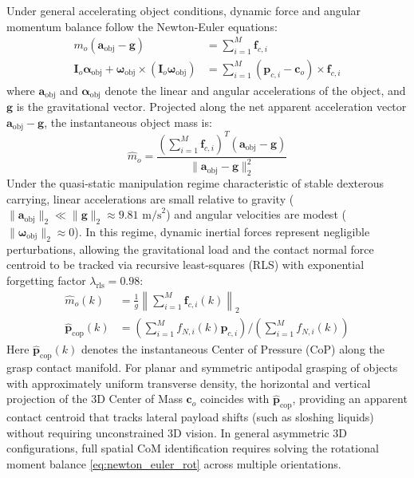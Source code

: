 Under general accelerating object conditions, dynamic force and angular momentum balance follow the Newton-Euler equations:
\begin{align}
    m_o (\mathbf{a}_{\text{obj}} - \mathbf{g}) &= \sum_{i=1}^M \mathbf{f}_{c, i} \label{eq:newton_euler_trans} \\
    \mathbf{I}_o \boldsymbol{\alpha}_{\text{obj}} + \boldsymbol{\omega}_{\text{obj}} \times (\mathbf{I}_o \boldsymbol{\omega}_{\text{obj}}) &= \sum_{i=1}^M (\mathbf{p}_{c, i} - \mathbf{c}_o) \times \mathbf{f}_{c, i} \label{eq:newton_euler_rot}
\end{align}
where $\mathbf{a}_{\text{obj}}$ and $\boldsymbol{\alpha}_{\text{obj}}$ denote the linear and angular accelerations of the object, and $\mathbf{g}$ is the gravitational vector. Projected along the net apparent acceleration vector $\mathbf{a}_{\text{obj}} - \mathbf{g}$, the instantaneous object mass is:
\begin{equation}
    \hat{m}_o = \frac{\left( \sum_{i=1}^M \mathbf{f}_{c, i} \right)^T (\mathbf{a}_{\text{obj}} - \mathbf{g})}{\|\mathbf{a}_{\text{obj}} - \mathbf{g}\|_2^2}
\end{equation}
Under the quasi-static manipulation regime characteristic of stable dexterous carrying, linear accelerations are small relative to gravity ($\|\mathbf{a}_{\text{obj}}\|_2 \ll \|\mathbf{g}\|_2 \approx 9.81\text{ m/s}^2$) and angular velocities are modest ($\|\boldsymbol{\omega}_{\text{obj}}\|_2 \approx 0$). In this regime, dynamic inertial forces represent negligible perturbations, allowing the gravitational load and the contact normal force centroid to be tracked via recursive least-squares (RLS) with exponential forgetting factor $\lambda_{\text{rls}} = 0.98$:
\begin{align}
    \hat{m}_o(k) &= \frac{1}{g} \left\| \sum_{i=1}^M \mathbf{f}_{c, i}(k) \right\|_2 \\
    \hat{\mathbf{p}}_{\text{cop}}(k) &= \left( \sum_{i=1}^M f_{N, i}(k) \mathbf{p}_{c, i} \right) \Bigg/ \left( \sum_{i=1}^M f_{N, i}(k) \right)
\end{align}
Here $\hat{\mathbf{p}}_{\text{cop}}(k)$ denotes the instantaneous Center of Pressure (CoP) along the grasp contact manifold. For planar and symmetric antipodal grasping of objects with approximately uniform transverse density, the horizontal and vertical projection of the 3D Center of Mass $\mathbf{c}_o$ coincides with $\hat{\mathbf{p}}_{\text{cop}}$, providing an apparent contact centroid that tracks lateral payload shifts (such as sloshing liquids) without requiring unconstrained 3D vision. In general asymmetric 3D configurations, full spatial CoM identification requires solving the rotational moment balance \eqref{eq:newton_euler_rot} across multiple orientations.

